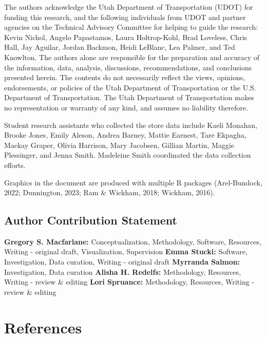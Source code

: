 \documentclass[
  letterpaper,
  authoryear,
  review,
  3p]{elsarticle}
\begin{document}
The authors acknowledge the Utah Department of Transportation (UDOT) for
funding this research, and the following individuals from UDOT and
partner agencies on the Technical Advisory Committee for helping to
guide the research: Kevin Nichol, Angelo Papastamos, Laura Holtrop-Kohl,
Brad Loveless, Chris Hall, Jay Aguilar, Jordan Backmon, Heidi LeBlanc,
Lea Palmer, and Ted Knowlton. The authors alone are responsible for the
preparation and accuracy of the information, data, analysis,
discussions, recommendations, and conclusions presented herein. The
contents do not necessarily reflect the views, opinions, endorsements,
or policies of the Utah Department of Transportation or the U.S.
Department of Transportation. The Utah Department of Transportation
makes no representation or warranty of any kind, and assumes no
liability therefore.

Student research assistants who collected the store data include Kaeli
Monahan, Brooke Jones, Emily Aleson, Andrea Barney, Mattie Earnest, Tare
Ekpagha, Mackay Graper, Olivia Harrison, Mary Jacobsen, Gillian Martin,
Maggie Plessinger, and Jenna Smith. Madeleine Smith coordinated the data
collection efforts.

Graphics in the document are produced with multiple R packages
(Arel-Bundock, 2022; Dunnington, 2023; Ram \& Wickham, 2018; Wickham,
2016).

\hypertarget{author-contribution-statement}{%
\subsection*{Author Contribution
Statement}\label{author-contribution-statement}}


\textbf{Gregory S. Macfarlane:} Conceptualization, Methodology,
Software, Resources, Writing - original draft, Visualization,
Supervision \textbf{Emma Stucki:} Software, Investigation, Data
curation, Writing - original draft \textbf{Myrranda Salmon:}
Investigation, Data curation \textbf{Alisha H. Redelfs:} Methodology,
Resources, Writing - review \& editing \textbf{Lori Spruance:}
Methodology, Resources, Writing - review \& editing


\hypertarget{references}{%
\section*{References}\label{references}}
\end{document}
